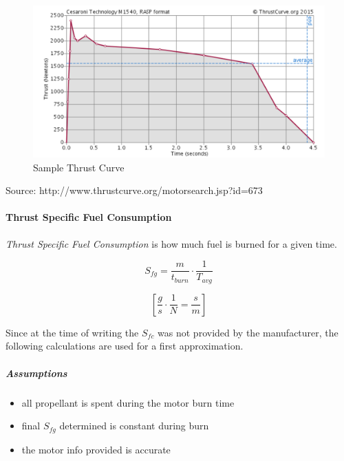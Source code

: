 \documentclass[]{book}
\providecommand{\tightlist}{%
  \setlength{\itemsep}{0pt}\setlength{\parskip}{0pt}}
\let\oldparagraph\paragraph
\renewcommand{\paragraph}[1]{\oldparagraph{#1}\mbox{}}
\let\oldsubparagraph\subparagraph
\renewcommand{\subparagraph}[1]{\oldsubparagraph{#1}\mbox{}}
\begin{document}

\begin{figure}[htbp]
\centering
\includegraphics{images/M1540_thrust_curve.png}
\caption{Sample Thrust Curve\label{thrust_curve_label}}
\end{figure}

Source: http://www.thrustcurve.org/motorsearch.jsp?id=673

\paragraph{Thrust Specific Fuel
Consumption}\label{thrust-specific-fuel-consumption}

\emph{Thrust Specific Fuel Consumption} is how much fuel is burned for a
given time.

\begin{equation}
S_{fg} = \dfrac{m}{t_{burn}}\cdot \dfrac{1}{T_{avg}}  
\end{equation}

\begin{equation}
\left[ \dfrac{g}{s}\cdot \dfrac{1}{N} = \dfrac{s}{m} \right]  
\end{equation}

Since at the time of writing the \(S_{fc}\) was not provided by the
manufacturer, the following calculations are used for a first
approximation.

\subparagraph{Assumptions}\label{assumptions-1}

\begin{itemize}
\tightlist
\item
  all propellant is spent during the motor burn time
\item
  final \(S_{fg}\) determined is constant during burn
\item
  the motor info provided is accurate
\end{itemize}
\end{document}
